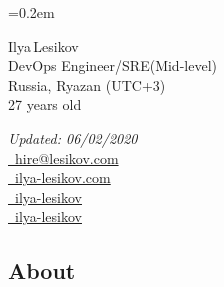 \documentclass[11pt, a4paper]{article}
\newcommand{\Delimitline}{
  \vspace{-2ex}
  \noindent\makebox[\linewidth]{\rule{\DelimitlineLength}{0.12ex}} }
\begin{document}
\sffamily

\font=0.2em

\newlength{\DelimitlineLength}
\setlength{\DelimitlineLength}{\textwidth+1em}

\pagecolor[RGB]{245,245,245}


{\setlength\multicolsep{0pt}\begin{multicols}{2}
    \begin{spacing}{1.6}\raggedright\rmfamily
    {\huge \vphantom{Name: }Ilya\,Lesikov}\\[1.8ex]
    {\Large \vphantom{Title: }DevOps Engineer/SRE\hspace{0.35em}(Mid-level)}\\
    {\Large \vphantom{Location: }Russia, Ryazan (UTC+3)}\\
    {\Large \vphantom{Age: }27 years old}
  \end{spacing}

  \columnbreak

  \begin{flushright}\begin{spacing}{1.3}\rmfamily
    \textit{Updated: 06/02/2020}\\[0.5ex]
    \large{
      \vphantom{contacts, contact information: }
      \faEnvelope \href{mailto:hire@lesikov.com}{\vphantom{Email: }\ hire@lesikov.com}\\
      \faInternetExplorer \href{https://ilya-lesikov.com}{\vphantom{Website: }\ ilya-lesikov.com}\\
      \faLinkedin \href{https://www.linkedin.com/in/ilya-lesikov}{\vphantom{LinkedIn: }\ ilya-lesikov}\\
      \faGithubAlt \href{https://github.com/ilya-lesikov}{\vphantom{GitHub: }\ ilya-lesikov}}
  \end{spacing}\end{flushright}
\end{multicols}}

\vspace{2ex}


\subsection*{About\vphantom{ (professional summary)}}
\Delimitline
\end{document}
